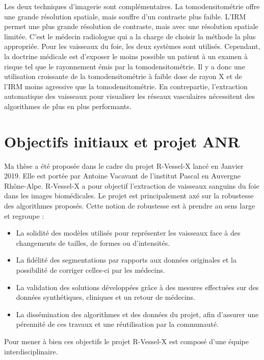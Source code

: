 Les deux techniques d'imagerie sont complémentaires. La tomodensitométrie offre une grande résolution spatiale, mais souffre d'un contraste plus faible. L'IRM permet une plus grande résolution de contraste, mais avec une résolution spatiale limitée. C'est le médecin radiologue qui a la charge de choisir la méthode la plus appropriée. Pour les vaisseaux du foie, les deux systèmes sont utilisés. Cependant, la doctrine médicale est d'exposer le moins possible un patient à un examen à risque tel que le rayonnement émis par la tomodensitométrie. Il y a donc une utilisation croissante de la tomodensitométrie à faible dose de rayon X et  de l'IRM moins agressive que la tomodensitométrie. En contrepartie, l'extraction automatique des vaisseaux pour visualiser les réseaux vasculaires nécessitent des algorithmes de plus en plus performants.


\section{Objectifs initiaux et projet ANR}
\label{sec:introduction:objectifs}

Ma thèse a été proposée dans le cadre du projet R-Vessel-X lancé en Janvier 2019. Elle est portée par Antoine Vacavant de l'institut Pascal en Auvergne Rhône-Alpe. R-Vessel-X a pour objectif l'extraction de vaisseaux sanguins du foie dans les images biomédicales. Le projet est principalement axé sur la robustesse des algorithmes proposés. Cette notion de robustesse est à prendre au sens large et regroupe :

\begin{itemize}
\item La solidité des modèles utilisés pour représenter les vaisseaux face à des changements de tailles, de formes ou d'intensités.
\item La fidélité des segmentations par rapports aux données originales et la possibilité de corriger celles-ci par les médecins.
\item La validation des solutions développées grâce à des mesures effectuées sur des données synthétiques, cliniques et un retour de médecins.
\item La dissémination des algorithmes et des données du projet, afin d'assurer une pérennité de ces travaux et une réutilisation par la communauté.
\end{itemize}

Pour mener à bien ces objectifs le projet R-Vessel-X est composé d'une équipe interdisciplinaire.

